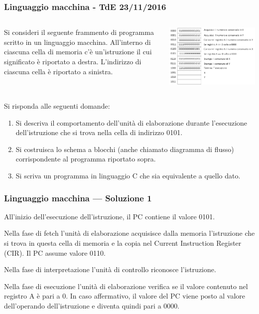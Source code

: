 \documentclass[aspectratio=169,]{beamer}
\begin{document}
\begin{frame}[allowframebreaks]
\frametitle{Linguaggio macchina - TdE 23/11/2016}
\begin{columns}
    \begin{column}{0.5\textwidth}
        Si consideri il seguente frammento di programma scritto in un linguaggio macchina.
        All'interno di ciascuna cella di memoria c'è un'istruzione il cui significato è riportato a destra.
        L'indirizzo di ciascuna cella è riportato a sinistra.
    \end{column}
    \begin{column}{0.5\textwidth}
        \includegraphics[width=\textwidth]{./codice_macchina}
    \end{column}
\end{columns}

Si risponda alle seguenti domande:
\pause
\begin{enumerate}
\item Si descriva il comportamento dell'unità di elaborazione durante l'esecuzione dell'istruzione che si trova nella cella di indirizzo 0101.
\item Si costruisca lo schema a blocchi (anche chiamato diagramma di flusso) corrispondente al programma riportato sopra.
\item Si scriva un programma in linguaggio C che sia equivalente a quello dato.
\end{enumerate}
\end{frame}

\begin{frame}
\frametitle{Linguaggio macchina --- Soluzione 1}
All'inizio dell'esecuzione dell'istruzione, il PC contiene il valore 0101.

Nella fase di fetch l'unità di elaborazione acquisisce dalla memoria l'istruzione che si trova in questa cella di memoria e la copia nel Current Instruction Register (CIR). Il PC assume valore 0110.

Nella fase di interpretazione l'unità di controllo riconosce l'istruzione.

Nella fase di esecuzione l'unità di elaborazione verifica se il valore contenuto nel registro A è pari a 0. In caso affermativo, il valore del PC viene posto al valore dell'operando dell'istruzione e diventa quindi pari a 0000.
\end{frame}
\end{document}

